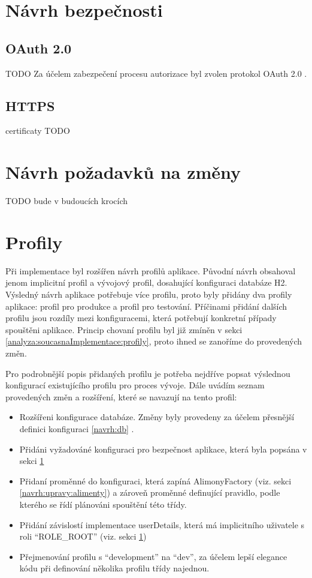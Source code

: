\section{Návrh bezpečnosti}\label{navrh:bezpecnost}
    \subsection{OAuth 2.0}
        TODO Za účelem zabezpečení procesu autorizace byl zvolen protokol OAuth 2.0 . 
        
    \subsection{HTTPS}
        certificaty TODO
        
\section{Návrh požadavků na změny}\label{navrh:requests}
    TODO bude v budoucích krocích
        
\section{Profily}\label{navrh:profily}
    Při implementace byl rozšířen návrh profilů aplikace. Původní návrh obsahoval jenom implicitní profil a vývojový profil, dosahující konfiguraci databáze H2. Výsledný návrh aplikace potřebuje více profilu, proto byly přidány dva profily aplikace: profil pro produkce a profil pro testování. Příčinami přidání dalších profilu jsou rozdíly mezi konfiguracemi, která potřebují konkretní případy spouštěni aplikace. Princip chovaní profilu byl již zmíněn v sekci \ref{analyza:soucasnaImplementace:profily}, proto ihned se zanoříme do provedených změn.
    
    Pro podrobnější popis přidaných profilu je potřeba nejdříve popsat výslednou konfigurací existujícího profilu pro proces vývoje. Dále uvádím seznam provedených změn a rozšíření, které se navazují na tento profil:
    \begin{itemize}
            \item Rozšířeni konfigurace databáze. Změny byly provedeny za účelem přesnější definici konfiguraci \ref{navrh:db} . 
            \item Přidáni vyžadováné konfiguraci pro bezpečnost aplikace, která byla popsána v sekci \ref{navrh:bezpecnost} 
            \item Přidaní proměnné do konfiguraci, která zapíná AlimonyFactory (viz. sekci \ref{navrh:upravy:alimenty}) a zároveň proměnné definující pravidlo, podle kterého se řídí plánováni spouštění této třídy.
            \item Přidání závislostí implementace userDetails, která má implicitního uživatele s roli \enquote{ROLE\_ROOT} (viz. sekci \ref{navrh:bezpecnost})
            \item Přejmenování profilu s \enquote{development} na \enquote{dev}, za účelem lepší elegance kódu při definování několika profilu třídy najednou.
    \end{itemize}
    

